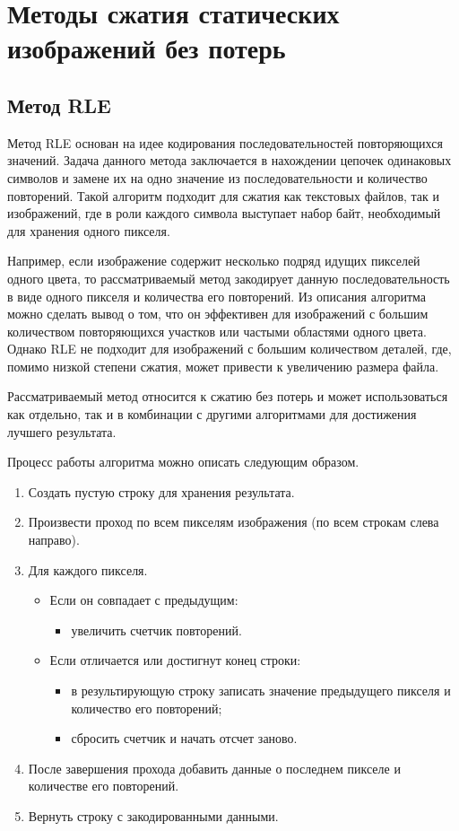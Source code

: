 \section{Методы сжатия статических изображений без потерь}

\subsection{Метод RLE}

Метод RLE \cite{RLE} основан на идее кодирования последовательностей повторяющихся значений. Задача данного метода заключается в нахождении цепочек одинаковых символов и замене их на одно значение из последовательности и количество повторений. Такой алгоритм подходит для сжатия как текстовых файлов, так и изображений, где в роли каждого символа выступает набор байт, необходимый для хранения одного пикселя.

Например, если изображение содержит несколько подряд идущих пикселей одного цвета, то рассматриваемый метод закодирует данную последовательность в виде одного пикселя и количества его повторений. Из описания алгоритма можно сделать вывод о том, что он эффективен для изображений с большим количеством повторяющихся участков или частыми областями одного цвета. Однако RLE не подходит для изображений с большим количеством деталей, где, помимо низкой степени сжатия, может привести к увеличению размера файла.

Рассматриваемый метод относится к сжатию без потерь и может использоваться как отдельно, так и в комбинации с другими алгоритмами для достижения лучшего результата.

Процесс работы алгоритма можно описать следующим образом.
\begin{enumerate}
    \item Создать пустую строку для хранения результата.
    \item Произвести проход по всем пикселям изображения (по всем строкам слева направо).
    \item Для каждого пикселя.
    \begin{itemize}
        \item Если он совпадает с предыдущим:
        \begin{itemize}
            \item увеличить счетчик повторений.
        \end{itemize}
        \item Если отличается или достигнут конец строки:
        \begin{itemize}
            \item в результирующую строку записать значение предыдущего пикселя и количество его повторений;
            \item сбросить счетчик и начать отсчет заново.
        \end{itemize}
    \end{itemize}
    \item После завершения прохода добавить данные о последнем пикселе и количестве его повторений.
    \item Вернуть строку с закодированными данными.
\end{enumerate}

